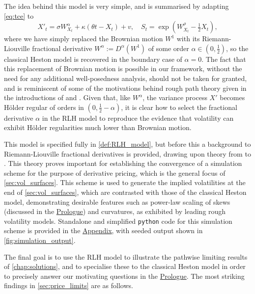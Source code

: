 The idea behind this model is very simple, and is summarised by adapting \autoref{eq:tce} to
\begin{equation}
    X'_t = \sigma W^\alpha_{X_t} + \kappa\left(\theta t - X_t\right) + v,\quad S_t = \exp\left(W^\rho_{X_t} - \tfrac12 X_t\right),
\end{equation}
where we have simply replaced the Brownian motion $W^1$ with its Riemann-Liouville fractional derivative $W^\alpha:=D^\alpha(W^1)$ of some order $\alpha\in(0,\frac12)$, so the classical Heston model is recovered in the boundary case of $\alpha=0$. The fact that this replacement of Brownian motion is possible in our framework, without the need for any additional well-posedness analysis, should not be taken for granted, and is reminiscent of some of the motivations behind rough path theory given in the introductions of \cite{friz_2010} and \cite{friz_2014}. Given that, like $W^\alpha$, the variance process $X'$ becomes H\"older regular of orders in $(0,\frac12-\alpha)$, it is clear how to select the fractional derivative $\alpha$ in the RLH model to reproduce the evidence that volatility can exhibit H\"older regularities much lower than Brownian motion.

This model is specified fully in \autoref{def:RLH_model}, but before this a background to Riemann-Liouville fractional derivatives is provided, drawing upon theory from \cite{hardy_1928} to \cite{hamadouche_2000}. This theory proves important for establishing the convergence of a simulation scheme for the purpose of derivative pricing, which is the general focus of \autoref{sec:vol_surfaces}. This scheme is used to generate the implied volatilities at the end of \autoref{sec:vol_surfaces}, which are contrasted with those of the classical Heston model, demonstrating desirable features such as power-law scaling of skews (discussed in the \hyperlink{prologue}{Prologue}) and curvatures, as exhibited by leading rough volatility models. Standalone and simplified \texttt{python} code for this simulation scheme is provided in the \hyperlink{appendix}{Appendix}, with seeded output shown in \autoref{fig:simulation_output}.

The final goal is to use the RLH model to illustrate the pathwise limiting results of \autoref{chap:solutions}, and to specialise these to the classical Heston model in order to precisely answer our motivating questions in the \hyperlink{prologue}{Prologue}. The most striking findings in \autoref{sec:price_limits} are as follows.

